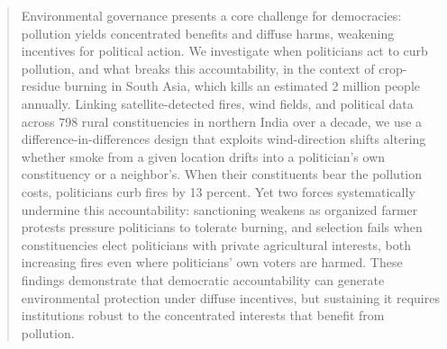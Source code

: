 \documentclass[12pt]{article}
\begin{document}
\begin{singlespace}
\begin{abstract}
Environmental governance presents a core challenge for democracies: pollution yields concentrated benefits and diffuse harms, weakening incentives for political action. We investigate when politicians act to curb pollution, and what breaks this accountability, in the context of crop-residue burning in South Asia, which kills an estimated 2 million people annually. Linking satellite-detected fires, wind fields, and political data across 798 rural constituencies in northern India over a decade, we use a difference-in-differences design that exploits wind-direction shifts altering whether smoke from a given location drifts into a politician's own constituency or a neighbor's. When their constituents bear the pollution costs, politicians curb fires by 13 percent. Yet two forces systematically undermine this accountability: sanctioning weakens as organized farmer protests pressure politicians to tolerate burning, and selection fails when constituencies elect politicians with private agricultural interests, both increasing fires even where politicians' own voters are harmed. These findings demonstrate that democratic accountability can generate environmental protection under diffuse incentives, but sustaining it requires institutions robust to the concentrated interests that benefit from pollution.




\end{abstract}

%


\end{singlespace}
\end{document}
